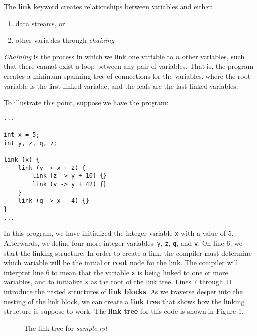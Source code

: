 \documentclass{article}
\newcommand{\code}{\texttt}
\begin{document}
The \textbf{link} keyword creates relationships between variables and
either:
\begin{enumerate}
\item data streams, or
\item other variables through \emph{chaining}
\end{enumerate}

\emph{Chaining} is the process in which we link one variable to $n$ other
variables, such that there cannot exist a loop between any pair of variables. That is, the program creates a minimum-spanning tree of connections for the variables,
where the root variable is the first linked variable, and the leafs are the last
linked variables. 

To illustrate this point, suppose we have the program:

\begin{lstlisting}[title=\emph{sample.rpl}]
...

int x = 5;
int y, z, q, v;

link (x) {
    link (y -> x + 2) {
        link (z -> y + 10) {}
        link (v -> y + 42) {}
    }
    link (q -> x - 4) {}
}
...
\end{lstlisting}

In this program, we have initialized the integer variable \code{x} with a value of 5. Afterwards, we define four more integer variables: \code{y}, \code{z}, \code{q}, and \code{v}. On line 6, we start the linking structure. In order to create a link, the compiler must determine which variable will be the initial or \textbf{root} node for the link. The compiler will interpret line 6 to mean that the variable \code{x} is being linked to one or more variables, and to initialize \code{x} as the root of the link tree. Lines 7 through 11 introduce the nested structures of \textbf{link blocks}. As we traverse deeper into the nesting of the link block, we can create a \textbf{link tree} that shows how the linking structure is suppose to work. The \textbf{link tree} for this code is shown in Figure 1.

\begin{wrapfigure}{r}{0.5\textwidth}
\centering
{}
\caption{The link tree for \emph{sample.rpl}}
\end{wrapfigure}
\end{document}
